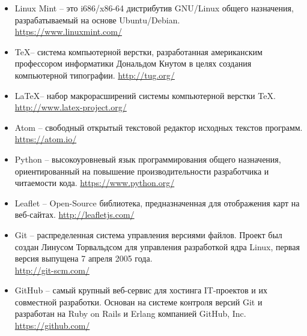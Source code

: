 \documentclass[a4paper, 14pt]{extreport}
\begin{document}
    \begin{itemize}
        \item Linux Mint -- это i686/x86-64 дистрибутив GNU/Linux общего 
            назначения, разрабатываемый на основе Ubuntu/Debian.\\
            \url{https://www.linuxmint.com/}
        \item \TeX -- система компьютерной верстки, разработанная американским профессором информатики 
            Дональдом Кнутом в целях создания компьютерной типографии.
            \hspace{1ex} \url{http://tug.org/}
        \item \LaTeX -- набор макрорасширений системы компьютерной верстки TeX.\\
            \url{http://www.latex-project.org/}
        \item Atom -- свободный открытый текстовой редактор исходных текстов программ.
            \hspace{1ex} \url{https://atom.io/}
        \item Python -- высокоуровневый язык программирования общего назначения, ориентированный на повышение 
            производительности разработчика и читаемости кода.
            \hspace{1ex} \url{https://www.python.org/}
        \item Leaflet -- Open-Source библиотека, предназначенная для отображения         карт на веб-сайтах.
            \hspace{1ex} \url{http://leafletjs.com/}
        \item Git -- распределенная система управления версиями файлов. Проект был создан Линусом 
            Торвальдсом для управления разработкой ядра Linux, первая версия выпущена 7 апреля 2005 года.\\
            \url{http://git-scm.com/}
        \item GitHub -- самый крупный веб-сервис для хостинга IT-проектов и их совместной разработки. 
            Основан на системе контроля версий Git и разработан на Ruby on Rails и Erlang компанией 
            GitHub, Inc.\\ \url{https://github.com/}
    \end{itemize}
\end{document}
